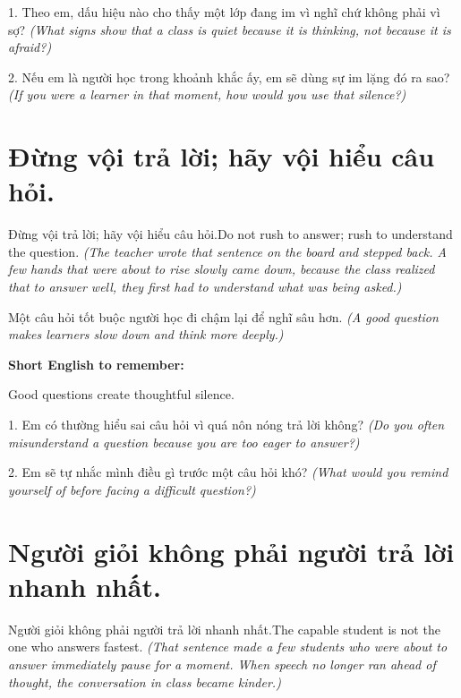 \begin{tuhocnhanh}
1. Theo em, dấu hiệu nào cho thấy một lớp đang im vì nghĩ chứ không phải vì sợ? \textit{(What signs show that a class is quiet because it is thinking, not because it is afraid?)}

2. Nếu em là người học trong khoảnh khắc ấy, em sẽ dùng sự im lặng đó ra sao? \textit{(If you were a learner in that moment, how would you use that silence?)}
\end{tuhocnhanh}
\ngancach


\section{Đừng vội trả lời; hãy vội hiểu câu hỏi.}
\begin{truyen}{Đừng vội trả lời; hãy vội hiểu câu hỏi.}{Do not rush to answer; rush to understand the question.}
\textit{(The teacher wrote that sentence on the board and stepped back. A few hands that were about to rise slowly came down, because the class realized that to answer well, they first had to understand what was being asked.)}
\end{truyen}

\begin{baihoc}
Một câu hỏi tốt buộc người học đi chậm lại để nghĩ sâu hơn.
\textit{(A good question makes learners slow down and think more deeply.)}
\end{baihoc}

\begin{ghinhoanh}
\textbf{Short English to remember:}

Good questions create thoughtful silence.

\end{ghinhoanh}

\begin{tuhocnhanh}
1. Em có thường hiểu sai câu hỏi vì quá nôn nóng trả lời không? \textit{(Do you often misunderstand a question because you are too eager to answer?)}

2. Em sẽ tự nhắc mình điều gì trước một câu hỏi khó? \textit{(What would you remind yourself of before facing a difficult question?)}
\end{tuhocnhanh}
\ngancach


\section{Người giỏi không phải người trả lời nhanh nhất.}
\begin{truyen}{Người giỏi không phải người trả lời nhanh nhất.}{The capable student is not the one who answers fastest.}
\textit{(That sentence made a few students who were about to answer immediately pause for a moment. When speech no longer ran ahead of thought, the conversation in class became kinder.)}
\end{truyen}

